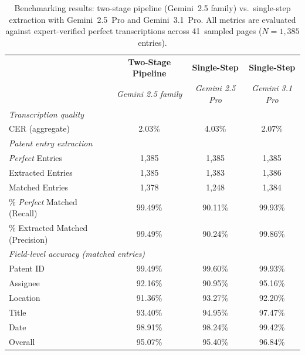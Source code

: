 \begin{table}[t]
\centering
\caption{Benchmarking results: two-stage pipeline (Gemini~2.5 family) vs.\ single-step extraction with Gemini~2.5~Pro and Gemini~3.1~Pro. All metrics are evaluated against expert-verified perfect transcriptions across 41~sampled pages ($N = 1{,}385$ entries).}
\label{tab:pipeline_comparison}
\begin{tabular}{lccc}
\toprule
 & \textbf{Two-Stage Pipeline} & \textbf{Single-Step} & \textbf{Single-Step} \\
 & \textit{Gemini 2.5 family} & \textit{Gemini 2.5 Pro} & \textit{Gemini 3.1 Pro} \\
\midrule
\multicolumn{4}{l}{\textit{Transcription quality}} \\[2pt]
CER (aggregate) & 2.03\% & 4.03\% & 2.07\% \\
\midrule
\multicolumn{4}{l}{\textit{Patent entry extraction}} \\[2pt]
\textit{Perfect} Entries & 1{,}385 & 1{,}385 & 1{,}385 \\
Extracted Entries & 1{,}385 & 1{,}383 & 1{,}386 \\
Matched Entries & 1{,}378 & 1{,}248 & 1{,}384 \\
\% \textit{Perfect} Matched (Recall) & 99.49\% & 90.11\% & 99.93\% \\
\% Extracted Matched (Precision) & 99.49\% & 90.24\% & 99.86\% \\
\midrule
\multicolumn{4}{l}{\textit{Field-level accuracy (matched entries)}} \\[2pt]
Patent ID & 99.49\% & 99.60\% & 99.93\% \\
Assignee & 92.16\% & 90.95\% & 95.16\% \\
Location & 91.36\% & 93.27\% & 92.20\% \\
Title & 93.40\% & 94.95\% & 97.47\% \\
Date & 98.91\% & 98.24\% & 99.42\% \\
\midrule
Overall & 95.07\% & 95.40\% & 96.84\% \\
\bottomrule
\end{tabular}
\begin{tablenotes}
\small

\end{tablenotes}
\end{table}
